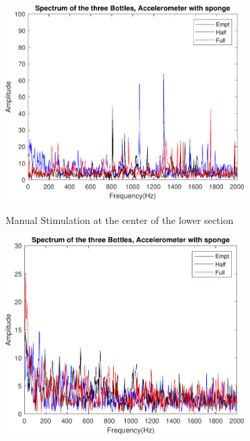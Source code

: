 \begin{figure}[]
    \centering
    \begin{subfigure}{0.45\textwidth}
        \centering
        \includegraphics[width=\linewidth]{Chapters/6CHP/Figures/ResultsSensors/AcEsMaBot.pdf}
        \caption{Manual Stimulation at the center of the lower section}{}
        \label{subfig:ResAcEsMaBot}
    \end{subfigure}
    \begin{subfigure}{0.45\textwidth}
        \centering
        \includegraphics[width=\linewidth]{Chapters/6CHP/Figures/ResultsSensors/AcEsAuBot.pdf}

\end{subfigure}
\end{figure}
